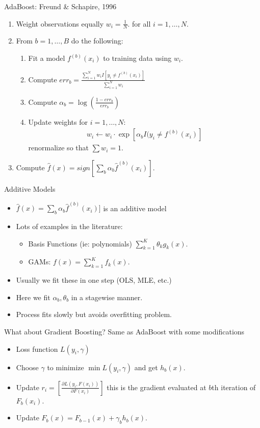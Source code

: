 \documentclass[xcolor=pdftex,dvipsnames,table,mathserif]{beamer}
\begin{document}
\begin{frame}{ AdaBoost: Freund \& Schapire, 1996}
\begin{enumerate}
\item Weight observations equally $w_i = \frac{1}{N}$. for all $i=1,\ldots,N$.
\item From $b=1,\ldots, B$ do the following:
\begin{enumerate}
\item Fit a model  $f^{(b)}(x_i)$ to training data using $w_i$.
\item Compute $err_b = \frac{\sum_{i=1}^N w_i I[ y_i \neq f^{(b)}(x_i) ]}{\sum_{i=1}^N w_i}$
\item Compute $\alpha_b = \log \left(  \frac{1-err_b}{err_b}\right)$
\item Update weights for $i=1,\ldots,N$: 
\begin{align*}
w_i \leftarrow w_i \cdot \exp[\alpha_b I (y_i \neq f^{(b)}(x_i) ]
\end{align*}
renormalize so that $\sum w_i =1$.
\end{enumerate}
\item Compute $\hat{f}(x) = sign[ \sum_{b} \alpha_b \hat{f}^{(b)}(x_i)]$.
\end{enumerate}
\end{frame}


\begin{frame}{Additive Models}
\begin{itemize}
\item $\hat{f}(x) = \sum_{b} \alpha_b \hat{f}^{(b)}(x_i)]$ is an \alert{additive model}
\item Lots of examples in the literature:
\begin{itemize}
\item  Basis Functions (ie: polynomials) $\sum_{k=1}^K \theta_k g_k(x)$.
\item GAMs: $f(x) = \sum_{k=1}^K f_k(x)$.
\end{itemize}
\item Usually we fit these in \alert{one step} (OLS, MLE, etc.)
\item Here we fit $\alpha_b, \theta_b$ in a \alert{stagewise} manner.
\item Process fits slowly but avoids overfitting problem.
\end{itemize}
\end{frame}




\begin{frame}{What about Gradient Boosting?}
Same as AdaBoost with some modifications
\begin{itemize}
\item Loss function $L(y_i,\gamma)$
\item Choose $\gamma$ to minimize $\min L(y_i,\gamma)$ and get $h_b(x)$.
\item Update $r_i = \left[ \frac{\partial L(y_i, F(x_i))}{ \partial F(x_i)} \right]$ this is the \alert{gradient} evaluated at $b$th iteration of $F_b(x_i)$.
\item Update $F_b(x) = F_{b-1}(x) + \gamma_b h_b(x)$.
\end{itemize}
\end{frame}
\end{document}
